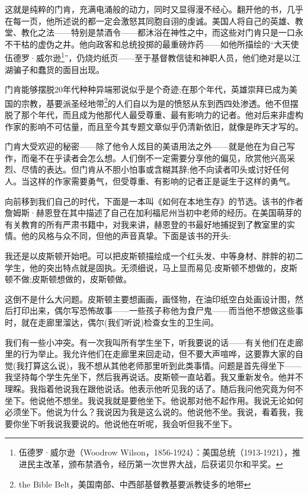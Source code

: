 这就是纯粹的门肯，充满电涌般的动力，同时又显得漫不经心。翻开他的书，几乎在每一页，他所述说的都一定会激怒其同胞自诩的虔诚。美国人将自己的英雄、教堂、教化之法——特别是禁酒令——都沐浴在神性之中，而这些对门肯只是一口永不干枯的虚伪之井。他向政客和总统投掷的最重磅炸药——如他所描绘的“大天使伍德罗·威尔逊\footnote{伍德罗·威尔逊（Woodrow Wilson，1856-1924）：美国总统（1913-1921），推进民主改革，颁布禁酒令，经历第一次世界大战，后获诺贝尔和平奖。}”，仍烧灼纸页——至于基督教信徒和神职人员，他们绝对是以江湖骗子和蠢货的面目出现。


门肯能够摆脱20年代种种异端邪说似乎是个奇迹;在那个年代，英雄崇拜已成为美国的宗教，基要派圣经地带\footnote{the Bible Belt，美国南部、中西部基督教基要派教徒多的地带}的人们自以为是的愤怒从东到西四处渗透。他不但摆脱了那个年代，而且成为他那代人最受尊重、最有影响力的记者。他对后来非虚构作家的影响不可估量，而且至今其专题文章似乎仍清新依旧，就像是昨天才写的。

门肯大受欢迎的秘密——除了他令人炫目的美语用法之外——就是他在为自己写作，而毫不在乎读者会怎么想。人们倒不一定需要分享他的偏见，欣赏他兴高采烈、尽情的表达。但门肯从不胆小怕事或含糊其辞;他不向读者叩头或讨好任何人。当这样的作家需要勇气，但受尊重、有影响的记者正是诞生于这样的勇气。

向前移到我们自己的时代，下面是一本叫《如何在本地生存》的节选。该书的作者詹姆斯·赫恩登在其中描述了自己在加利福尼州当初中老师的经历。在美国萌芽的有关教育的所有严肃书籍中，对我来讲，赫恩登的书最好地捕捉到了教室里的实情。他的风格与众不同，但他的声音真挚。下面是该书的开头:

我还是以皮斯顿开始吧。可以把皮斯顿描绘成一个红头发、中等身材、胖胖的初二学生，他的突出特点就是固执。无须细说，马上显而易见:皮斯顿不想做的，皮斯顿不做;皮斯顿想做的，皮斯顿做。

这倒不是什么大问题。皮斯顿主要想画画，画怪物，在油印纸空白处画设计图，然后打印出来，偶尔写恐怖故事——一些孩子称他为食尸鬼——而当他不想做这些事时，就在走廊里溜达，偶尔(我们听说)检查女生的卫生间。

我们有一些小冲突。有一次我叫所有学生坐下，听我要说的话——有关他们在走廊里的行为举止。我允许他们在走廊里来回走动，但不要大声喧哗，这要靠大家的自觉(我打算这么说)，我不想从其他老师那里听到此类事情。问题是首先得坐下——我坚持每个学生先坐下，然后我再说话。皮斯顿一直站着。我又重新发令。他并不理睬。我指着他说我在跟他说话。他表示他听见我的话了。随后我问他究竟为何不坐下。他说他不想坐。我说我就是要他坐下。他说那对他不起作用。我说无论如何必须坐下。他说为什么？我说因为我是这么说的。他说他不坐。我说，看着我，我要你坐下听我说我要说的。他说他在听呢，我会听但我不坐下。

